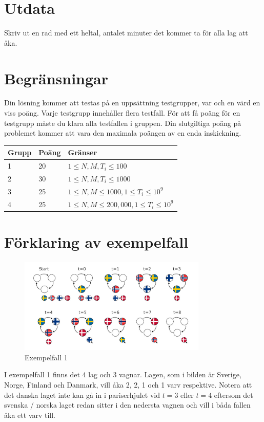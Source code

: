 \section*{Utdata}
Skriv ut en rad med ett heltal, antalet minuter det kommer ta för alla lag att åka.

\section*{Begränsningar}
Din lösning kommer att testas på en uppsättning testgrupper, var och en värd en viss poäng.
Varje testgrupp innehåller flera testfall.
För att få poäng för en testgrupp måste du klara alla testfallen i gruppen.
Din slutgiltiga poäng på problemet kommer att vara den maximala poängen av en enda inskickning.

\noindent
\begin{tabular}{| l | l | l |}
\hline
Grupp & Poäng & Gränser \\ \hline
1     & 20    & $1 \le N, M, T_i \le 100$ \\ \hline
2     & 30    & $1 \le N, M, T_i \le 1000$ \\ \hline
3     & 25    & $1 \le N, M \le 1000, 1 \le T_i \le 10^9$ \\ \hline
4     & 25    & $1 \le N, M \le 200,000, 1 \le T_i \le 10^9$ \\ \hline
\end{tabular}

\section*{Förklaring av exempelfall}

\begin{figure}[h]
	\centering
\includegraphics[width=0.8\textwidth]{sample1}
\caption{Exempelfall 1}
\end{figure}

I exempelfall 1 finns det 4 lag och 3 vagnar.
Lagen, som i bilden är Sverige, Norge, Finland och Danmark, vill åka 2, 2, 1 och 1 varv respektive.
Notera att det danska laget inte kan gå in i pariserhjulet vid $t=3$ eller $t=4$
eftersom det svenska / norska laget redan sitter i den nedersta vagnen och vill i båda fallen åka ett varv till.
